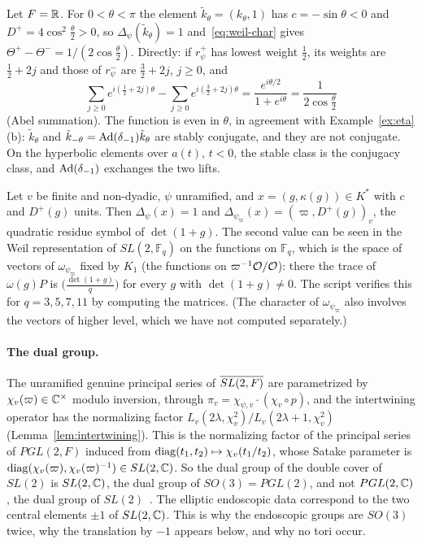 \begin{example}\label{ex:Delta-real}
Let $F=\mathbb{R}$. For $0<\theta<\pi$ the element $\tilde k_\theta=(k_\theta,1)$
has $c=-\sin\theta<0$ and $D^+=4\cos^2\frac\theta2>0$, so
$\Delta_\psi(\tilde k_\theta)=1$ and~\eqref{eq:weil-char} gives
$\Theta^+-\Theta^-=1/(2\cos\frac\theta2)$. Directly: if $r^+_\psi$ has
lowest weight $\frac12$, its weights are $\frac12+2j$ and those of
$r^-_\psi$ are $\frac32+2j$, $j\ge0$, and
\[
\sum_{j\ge0}e^{i(\frac12+2j)\theta}-\sum_{j\ge0}e^{i(\frac32+2j)\theta}
=\frac{e^{i\theta/2}}{1+e^{i\theta}}=\frac1{2\cos\frac\theta2}
\]
(Abel summation). The function is even in $\theta$, in agreement with
Example~\ref{ex:eta}(b): $\tilde k_\theta$ and $\tilde k_{-\theta}=
\operatorname{Ad}(\delta_{-1})\tilde k_\theta$ are stably conjugate, and they
are not conjugate. On the hyperbolic elements over $a(t)$, $t<0$, the
stable class is the conjugacy class, and $\operatorname{Ad}(\delta_{-1})$
exchanges the two lifts.
\end{example}

\begin{example}\label{ex:Delta-finite}
Let $v$ be finite and non-dyadic, $\psi$ unramified, and $x=(g,\kappa(g))
\in K^*$ with $c$ and $D^+(g)$ units. Then $\Delta_\psi(x)=1$ and
$\Delta_{\psi_\varpi}(x)=(\varpi,D^+(g))_v$, the quadratic residue symbol
of $\det(1+g)$. The second value can be seen in the Weil representation
of $SL(2,\mathbb F_q)$ on the functions on $\mathbb F_q$, which is the
space of vectors of $\omega_{\psi_\varpi}$ fixed by $K_1$ (the functions on
$\varpi^{-1}\mathcal{O}/\mathcal{O}$): there the trace of $\omega(g)P$ is
$\bigl(\frac{\det(1+g)}{q}\bigr)$ for every $g$ with $\det(1+g)\ne0$. The
script verifies this for $q=3,5,7,11$ by computing the matrices. (The
character of $\omega_{\psi_\varpi}$ also involves the vectors of higher
level, which we have not computed separately.)
\end{example}

\paragraph{The dual group.} The unramified genuine principal series of
$\overline{SL(2,F)}$ are parametrized by $\chi_v(\varpi)\in\mathbb{C}^\times$ modulo inversion,
through $\pi_v=\chi_{\psi,v}\cdot(\chi_v\circ p)$, and the intertwining
operator has the normalizing factor $L_v(2\lambda,\chi_v^2)/L_v(2\lambda+1,
\chi_v^2)$ (Lemma~\ref{lem:intertwining}). This is the normalizing factor
of the principal series of $PGL(2,F)$ induced from $\operatorname{diag}(t_1,t_2)\mapsto
\chi_v(t_1/t_2)$, whose Satake parameter is $\operatorname{diag}(\chi_v(\varpi),
\chi_v(\varpi)^{-1})\in SL(2,\mathbb{C})$. So the dual group of the double cover
of $SL(2)$ is $SL(2,\mathbb{C})$, the dual group of $SO(3)=PGL(2)$, and not
$PGL(2,\mathbb{C})$, the dual group of $SL(2)$~\cite{Sa88,Li11,GGW18,We18}. The
elliptic endoscopic data correspond to the two central elements $\pm1$
of $SL(2,\mathbb{C})$. This is why the endoscopic groups are $SO(3)$ twice, why
the translation by $-1$ appears below, and why no tori occur.

